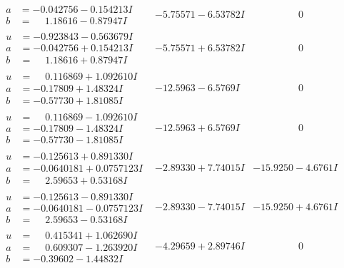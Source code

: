 \documentclass[1p]{elsarticle_modified}
\theoremstyle{definition}
\begin{document}
$$\begin{array}{c|c|c}
\begin{aligned}
a &= -0.042756 - 0.154213 I \\
b &= \phantom{-}1.18616 - 0.87947 I\end{aligned}
 & -5.75571 - 6.53782 I & \phantom{-0.000000 } 0 \\ \hline\begin{aligned}
u &= -0.923843 - 0.563679 I \\
a &= -0.042756 + 0.154213 I \\
b &= \phantom{-}1.18616 + 0.87947 I\end{aligned}
 & -5.75571 + 6.53782 I & \phantom{-0.000000 } 0 \\ \hline\begin{aligned}
u &= \phantom{-}0.116869 + 1.092610 I \\
a &= -0.17809 + 1.48324 I \\
b &= -0.57730 + 1.81085 I\end{aligned}
 & -12.5963 - 6.5769 I & \phantom{-0.000000 } 0 \\ \hline\begin{aligned}
u &= \phantom{-}0.116869 - 1.092610 I \\
a &= -0.17809 - 1.48324 I \\
b &= -0.57730 - 1.81085 I\end{aligned}
 & -12.5963 + 6.5769 I & \phantom{-0.000000 } 0 \\ \hline\begin{aligned}
u &= -0.125613 + 0.891330 I \\
a &= -0.0640181 + 0.0757123 I \\
b &= \phantom{-}2.59653 + 0.53168 I\end{aligned}
 & -2.89330 + 7.74015 I & -15.9250 - 4.6761 I \\ \hline\begin{aligned}
u &= -0.125613 - 0.891330 I \\
a &= -0.0640181 - 0.0757123 I \\
b &= \phantom{-}2.59653 - 0.53168 I\end{aligned}
 & -2.89330 - 7.74015 I & -15.9250 + 4.6761 I \\ \hline\begin{aligned}
u &= \phantom{-}0.415341 + 1.062690 I \\
a &= \phantom{-}0.609307 - 1.263920 I \\
b &= -0.39602 - 1.44832 I\end{aligned}
 & -4.29659 + 2.89746 I & \phantom{-0.000000 } 0 \\ \hline\begin{aligned}

\end{aligned}
\end{array}$$
\end{document}
